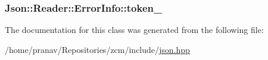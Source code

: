 \subsubsection[{\texorpdfstring{token\+\_\+}{token_}}]{ Json\+::\+Reader\+::\+Error\+Info\+::token\+\_\+}\hypertarget{classJson_1_1Reader_1_1ErrorInfo_a52e1c71b12eb1c3f0395d7ef1e778ce6}{}\label{classJson_1_1Reader_1_1ErrorInfo_a52e1c71b12eb1c3f0395d7ef1e778ce6}


The documentation for this class was generated from the following file\+:\begin{DoxyCompactItemize}
\item 
/home/pranav/\+Repositories/zcm/include/\hyperlink{json_8hpp}{json.\+hpp}\end{DoxyCompactItemize}
